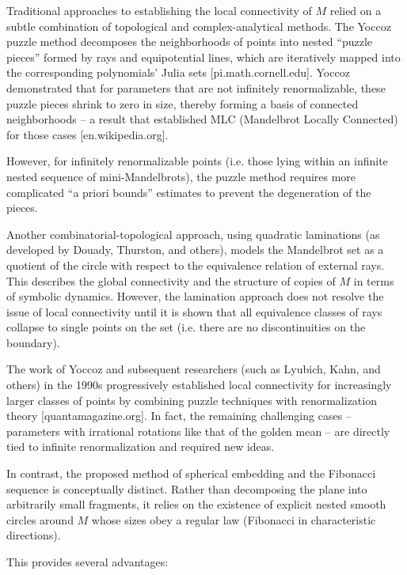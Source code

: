 \documentclass[12pt]{article}
\begin{document}
Traditional approaches to establishing the local connectivity of \(M\) relied on a subtle combination of topological and complex-analytical methods. The Yoccoz puzzle method decomposes the neighborhoods of points into nested ``puzzle pieces'' formed by rays and equipotential lines, which are iteratively mapped into the corresponding polynomials' Julia sets [pi.math.cornell.edu]. Yoccoz demonstrated that for parameters that are not infinitely renormalizable, these puzzle pieces shrink to zero in size, thereby forming a basis of connected neighborhoods -- a result that established MLC (Mandelbrot Locally Connected) for those cases [en.wikipedia.org].

However, for infinitely renormalizable points (i.e. those lying within an infinite nested sequence of mini-Mandelbrots), the puzzle method requires more complicated ``a priori bounds'' estimates to prevent the degeneration of the pieces.

Another combinatorial-topological approach, using quadratic laminations (as developed by Douady, Thurston, and others), models the Mandelbrot set as a quotient of the circle with respect to the equivalence relation of external rays. This describes the global connectivity and the structure of copies of \(M\) in terms of symbolic dynamics. However, the lamination approach does not resolve the issue of local connectivity until it is shown that all equivalence classes of rays collapse to single points on the set (i.e. there are no discontinuities on the boundary).

The work of Yoccoz and subsequent researchers (such as Lyubich, Kahn, and others) in the 1990s progressively established local connectivity for increasingly larger classes of points by combining puzzle techniques with renormalization theory [quantamagazine.org]. In fact, the remaining challenging cases -- parameters with irrational rotations like that of the golden mean -- are directly tied to infinite renormalization and required new ideas.

In contrast, the proposed method of spherical embedding and the Fibonacci sequence is conceptually distinct. Rather than decomposing the plane into arbitrarily small fragments, it relies on the existence of explicit nested smooth circles around \(M\) whose sizes obey a regular law (Fibonacci in characteristic directions).

This provides several advantages:
\end{document}
